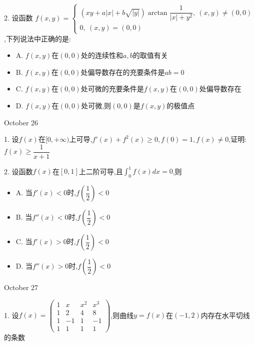 2. 设函数 $f(x,y)=\left\lbrace 
\begin{array}{l}
	(xy+a|x|+b\sqrt{|y|})\arctan \dfrac{1}{|x|+y^2},\ (x,y)\neq (0,0)\\
	0,\ (x,y)=(0,0)
\end{array}
\right. $,下列说法中正确的是:  
\begin{itemize}
	\item A. $f(x,y)$在$(0,0)$处的连续性和$a,b$的取值有关
	\item B. $f(x,y)$在$(0,0)$处偏导数存在的充要条件是$ab=0$
	\item C. $f(x,y)$在$(0,0)$处可微的充要条件是$f(x,y)$在$(0,0)$处偏导数存在
	\item D. $f(x,y)$在$(0,0)$处可微,则$(0,0)$是$f(x,y)$的极值点
\end{itemize}

\begin{solution}
	
\end{solution}


\textcolor{purplea}{October 26}

1. 设$f(x)$在$[0,+\infty)$上可导,$f'(x)+f^2(x)\geq 0,f(0)=1,f(x)\neq 0$,证明:  $f(x)\geq \dfrac{1}{x+1}$

\begin{solution}
	
\end{solution}


2. 设函数$f(x)$在$[0,1]$上二阶可导,且$\int_{0}^{1}f(x)dx=0$,则
\begin{itemize}
	\item A. 当$f'(x)<0$时,$f(\dfrac{1}{2})<0$
	\item B. 当$f''(x)<0$时,$f(\dfrac{1}{2})<0$
	\item C. 当$f'(x)>0$时,$f(\dfrac{1}{2})<0$
	\item D. 当$f''(x)>0$时,$f(\dfrac{1}{2})<0$
\end{itemize}

\begin{solution}
	
\end{solution}


\textcolor{purplea}{October 27}

1. 设$f(x)=\begin{pmatrix}
	1&x&x^2&x^3\\
	1&2&4&8\\
	1&-1&1&-1\\
	1&1&1&1
\end{pmatrix}$,则曲线$y=f(x)$在$(-1,2)$内存在水平切线的条数

